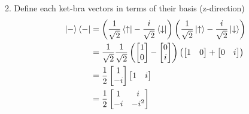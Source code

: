 \documentclass[12pt]{article}
\begin{document}
2. Define each ket-bra vectors in terms of their basis (z-direction)
\begin{equation}
    \begin{split}
        \ket{-}\bra{-} &= \left(\frac{1}{\sqrt{2}}\bra{\uparrow} - \frac{i}{\sqrt{2}}\bra{\downarrow}\right)\left(\frac{1}{\sqrt{2}}\ket{\uparrow} - \frac{i}{\sqrt{2}}\ket{\downarrow}\right) \\
        &= \frac{1}{\sqrt{2}}\frac{1}{\sqrt{2}}\left(\begin{bmatrix} 1 \\ 0 \end{bmatrix} - \begin{bmatrix} 0 \\ i \end{bmatrix}\right)\left(\begin{bmatrix} 1 & 0 \end{bmatrix} + \begin{bmatrix} 0 & i \end{bmatrix}\right) \\
        &= \frac{1}{2}\begin{bmatrix} 1 \\ -i \end{bmatrix}\begin{bmatrix} 1 & i \end{bmatrix} \\
        &= \frac{1}{2}\begin{bmatrix} 1 & i \\ -i & -i^2 \end{bmatrix} \\
    \end{split}
\end{equation}
\end{document}
